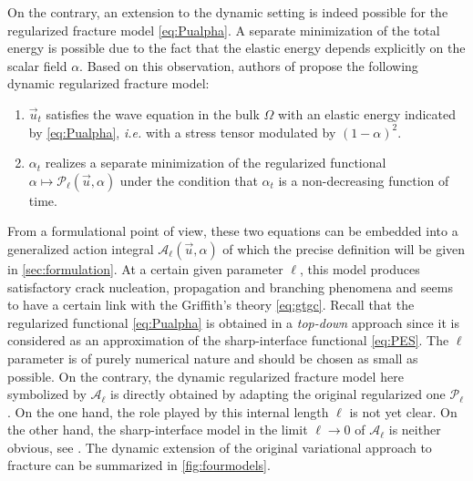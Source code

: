 On the contrary, an extension to the dynamic setting is indeed possible for the regularized fracture model \eqref{eq:Pualpha}. A separate minimization of the total energy is possible due to the fact that the elastic energy depends explicitly on the scalar field $\alpha$. Based on this observation, authors of \cite{Bourdin:2011} propose the following dynamic regularized fracture model:
\begin{enumerate}
\item $\vec{u}_t$ satisfies the wave equation in the bulk $\Omega$ with an elastic energy indicated by \eqref{eq:Pualpha}, \emph{i.e.} with a stress tensor modulated by $(1-\alpha)^2$.

\item $\alpha_t$ realizes a separate minimization of the regularized functional $\alpha\mapsto\mathcal{P}_\ell(\vec{u},\alpha)$ under the condition that $\alpha_t$ is a non-decreasing function of time.
\end{enumerate}
From a formulational point of view, these two equations can be embedded into a generalized action integral $\mathcal{A}_\ell(\vec{u},\alpha)$ of which the precise definition will be given in \cref{sec:formulation}. At a certain given parameter $\ell$, this model produces satisfactory crack nucleation, propagation and branching phenomena and seems to have a certain link with the Griffith's theory \eqref{eq:gtgc}. Recall that the regularized functional \eqref{eq:Pualpha} is obtained in a \emph{top-down} approach since it is considered as an approximation of the sharp-interface functional \eqref{eq:PES}. The $\ell$ parameter is of purely numerical nature and should be chosen as small as possible. On the contrary, the dynamic regularized fracture model \cite{Bourdin:2011} here symbolized by $\mathcal{A}_\ell$ is directly obtained by adapting the original regularized one $\mathcal{P}_\ell$. On the one hand, the role played by this internal length $\ell$ is not yet clear. On the other hand, the sharp-interface model in the limit $\ell\to 0$ of $\mathcal{A}_\ell$ is neither obvious, see \cite{Bourdin:2011}. The dynamic extension of the original variational approach to fracture \cite{BourdinFrancfortMarigo:2008} can be summarized in \cref{fig:fourmodels}.
